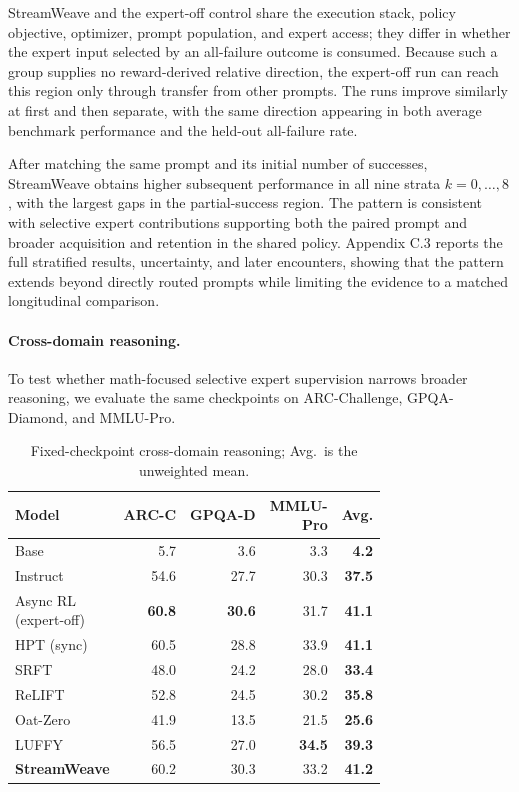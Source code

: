 \documentclass[letterpaper]{article}
\begin{document}
StreamWeave and the expert-off control share the execution stack, policy objective, optimizer, prompt population, and expert access; they differ in whether the expert input selected by an all-failure outcome is consumed.
Because such a group supplies no reward-derived relative direction, the expert-off run can reach this region only through transfer from other prompts.
The runs improve similarly at first and then separate, with the same direction appearing in both average benchmark performance and the held-out all-failure rate.

After matching the same prompt and its initial number of successes, StreamWeave obtains higher subsequent performance in all nine strata $k=0,\ldots,8$, with the largest gaps in the partial-success region.
The pattern is consistent with selective expert contributions supporting both the paired prompt and broader acquisition and retention in the shared policy.
Appendix C.3 reports the full stratified results, uncertainty, and later encounters, showing that the pattern extends beyond directly routed prompts while limiting the evidence to a matched longitudinal comparison.

\paragraph{Cross-domain reasoning.}
To test whether math-focused selective expert supervision narrows broader reasoning, we evaluate the same checkpoints on ARC-Challenge, GPQA-Diamond, and MMLU-Pro.

\begin{table}[!htbp]
\centering
\begin{tabular}{@{}lrrrr@{}}
\toprule
Model & ARC-C & GPQA-D & \shortstack{MMLU-\\Pro} & \textbf{Avg.} \\
\midrule
Base & 5.7 & 3.6 & 3.3 & \textbf{4.2} \\
Instruct & 54.6 & 27.7 & 30.3 & \textbf{37.5} \\
\shortstack[l]{Async RL\\(expert-off)} & \textbf{60.8} & \textbf{30.6} & 31.7 & \textbf{41.1} \\
HPT (sync) & 60.5 & 28.8 & 33.9 & \textbf{41.1} \\
SRFT & 48.0 & 24.2 & 28.0 & \textbf{33.4} \\
ReLIFT & 52.8 & 24.5 & 30.2 & \textbf{35.8} \\
Oat-Zero & 41.9 & 13.5 & 21.5 & \textbf{25.6} \\
LUFFY & 56.5 & 27.0 & \textbf{34.5} & \textbf{39.3} \\
\textbf{StreamWeave} & 60.2 & 30.3 & 33.2 & \textbf{41.2} \\
\bottomrule
\end{tabular}
\caption{Fixed-checkpoint cross-domain reasoning; Avg.\ is the unweighted mean.}
\label{tab:cross-domain}
\end{table}
\end{document}

